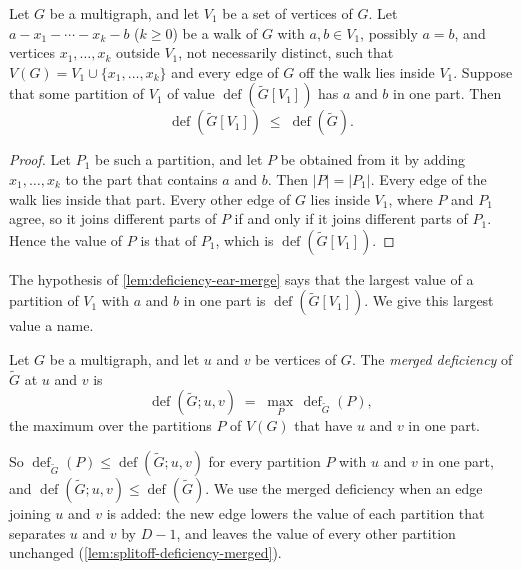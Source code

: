 \begin{lemma}
  \label{lem:deficiency-ear-merge}
  \leanok
  Let $G$ be a multigraph, and let $V_1$ be a set of vertices of $G$.
  Let $a - x_1 - \cdots - x_k - b$ ($k \ge 0$) be a walk of $G$ with
  $a, b \in V_1$, possibly $a = b$, and vertices $x_1, \dots, x_k$
  outside $V_1$, not necessarily distinct, such that
  $V(G) = V_1 \cup \{x_1, \dots, x_k\}$ and every edge of $G$ off the
  walk lies inside $V_1$. Suppose that some partition of $V_1$ of value
  $\operatorname{def}(\tilde G[V_1])$ has $a$ and $b$ in one part. Then
  \[
    \operatorname{def}(\tilde G[V_1]) \;\le\; \operatorname{def}(\tilde G).
  \]
\end{lemma}
\begin{proof}
  \leanok
  Let $P_1$ be such a partition, and let $P$ be obtained from it by
  adding $x_1, \dots, x_k$ to the part that contains $a$ and $b$. Then
  $|P| = |P_1|$. Every edge of the walk lies inside that part. Every
  other edge of $G$ lies inside $V_1$, where $P$ and $P_1$ agree, so it
  joins different parts of $P$ if and only if it joins different parts
  of $P_1$. Hence the value of $P$ is that of $P_1$, which is
  $\operatorname{def}(\tilde G[V_1])$.
\end{proof}

The hypothesis of \cref{lem:deficiency-ear-merge} says that the largest
value of a partition of $V_1$ with $a$ and $b$ in one part is
$\operatorname{def}(\tilde G[V_1])$. We give this largest value a name.

\begin{definition}
  \label{def:deficiency-merged}
  \leanok
  Let $G$ be a multigraph, and let $u$ and $v$ be vertices of $G$. The
  \emph{merged deficiency} of $\tilde G$ at $u$ and $v$ is
  \[
    \operatorname{def}(\tilde G; u, v) \;=\; \max_{P}\,
      \operatorname{def}_{\tilde G}(P),
  \]
  the maximum over the partitions $P$ of $V(G)$ that have $u$ and $v$ in
  one part.
\end{definition}

So $\operatorname{def}_{\tilde G}(P) \le \operatorname{def}(\tilde G; u, v)$
for every partition $P$ with $u$ and $v$ in one part, and
$\operatorname{def}(\tilde G; u, v) \le \operatorname{def}(\tilde G)$.
We use the merged deficiency when an edge joining $u$ and $v$ is added:
the new edge lowers the value of each partition that separates $u$ and
$v$ by $D - 1$, and leaves the value of every other partition unchanged
(\cref{lem:splitoff-deficiency-merged}).

